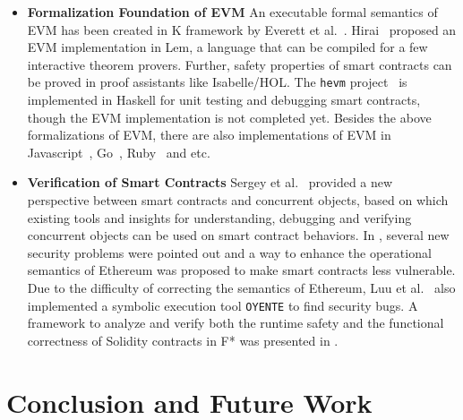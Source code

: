 \documentclass[runningheads]{llncs}
\begin{document}
\begin{itemize}
    \item \textbf{Formalization Foundation of EVM} An executable formal semantics of EVM has been created in K framework by Everett et al.~\cite{hildenbrandt2017kevm}. Hirai~\cite{hirai2017defining} proposed an EVM implementation in Lem, a language that can be compiled for a few interactive theorem provers. Further, safety properties of smart contracts can be proved in proof assistants like Isabelle/HOL. The \texttt{hevm} project~\cite{hevm} is implemented in Haskell for unit testing and debugging smart contracts, though the EVM implementation is not completed yet. Besides the above formalizations of EVM, there are also implementations of EVM in Javascript~\cite{vmjs}, Go~\cite{vmgo}, Ruby~\cite{cryptape} and etc.
    \item \textbf{Verification of Smart Contracts} Sergey et al.~\cite{sergey2017concurrent} provided a new perspective between smart contracts and concurrent objects, based on which existing tools and insights for understanding, debugging and verifying concurrent objects can be used on smart contract behaviors. In \cite{luu2016making}, several new security problems were pointed out and a way to enhance the operational semantics of Ethereum was proposed to make smart contracts less vulnerable. Due to the difficulty of correcting the semantics of Ethereum, Luu et al.~\cite{luu2016making} also implemented a symbolic execution tool \texttt{OYENTE} to find security bugs. A framework to analyze and verify both the runtime safety and the functional correctness of Solidity contracts in F* was presented in \cite{bhargavan2016formal}.
\end{itemize} 

\section{Conclusion and Future Work}\label{Sec: Conclusion}




%
%
%


%
%
\end{document}
